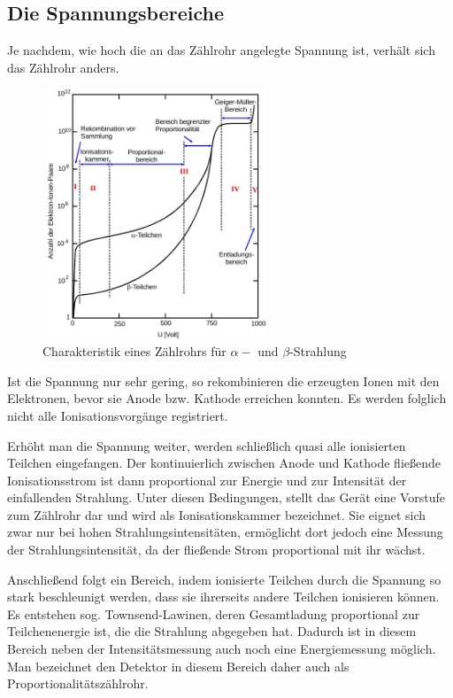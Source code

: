 \subsection{Die Spannungsbereiche}
Je nachdem, wie hoch die an das Zählrohr angelegte Spannung ist, verhält sich das Zählrohr anders.

\begin{figure}[h]
	\includegraphics[width=0.6\textwidth]{pics/charak.jpg}
	\caption{Charakteristik eines Zählrohrs für $\alpha- \text{ und } \beta$-Strahlung}
\end{figure}

Ist die Spannung nur sehr gering, so rekombinieren die erzeugten Ionen mit den Elektronen, bevor sie Anode bzw. Kathode erreichen konnten. Es werden folglich nicht alle Ionisationsvorgänge registriert.

Erhöht man die Spannung weiter, werden schließlich quasi alle ionisierten Teilchen eingefangen. Der kontinuierlich zwischen Anode und Kathode fließende Ionisationsstrom ist dann proportional zur Energie und zur Intensität der einfallenden Strahlung. Unter diesen Bedingungen, stellt das Gerät eine Vorstufe zum Zählrohr dar und wird als Ionisationskammer bezeichnet. Sie eignet sich zwar nur bei hohen Strahlungsintensitäten, ermöglicht dort jedoch eine Messung der Strahlungsintensität, da der fließende Strom proportional mit ihr wächst.

Anschließend folgt ein Bereich, indem ionisierte Teilchen durch die Spannung so stark  beschleunigt werden, dass sie ihrerseits andere Teilchen ionisieren können. Es entstehen sog. Townsend-Lawinen, deren Gesamtladung proportional zur Teilchenenergie ist, die die Strahlung abgegeben hat. Dadurch ist in diesem Bereich neben der Intensitätsmessung auch noch eine Energiemessung möglich. Man bezeichnet den Detektor in diesem Bereich daher auch als Proportionalitätszählrohr.

